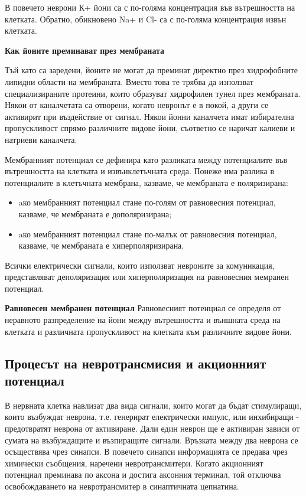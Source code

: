 \documentclass{article}
\numberwithin{equation}{section}
\begin{document}
В повечето неврони К+ йони са с по-голяма концентрация във вътрешността на клетката. Обратно, обикновено Na+ и Cl- са с по-голяма концентрация извън клетката.

\vspace{5mm}
\textbf{Как йоните преминават през мембраната}

Тъй като са заредени, йоните не могат да преминат директно през хидрофобните липидни области на мембраната. Вместо това те трябва да
използват специализираните протеини, които образуват хидрофилен тунел през мембраната. Някои от каналчетата са отворени, когато невронът е в
покой, а други се активирит при въздействие от сигнал. Някои йонни каналчета имат избирателна пропускливост спрямо различните видове
йони, съответно се наричат калиеви и натриеви каналчета.

\vspace{5mm} %

Мембранният потенциал се дефинира като разликата между потенциалите във вътрешността на клетката и извънклетъчната среда.
Понеже има разлика в потенциалите в клетъчната мембрана, казваме, че мембраната е поляризирана:
\begin{itemize}
  \item aко мембранният потенциал стане по-голям от равновесния потенциал, казваме, че мембраната е дополяризирана;
  \item aко мембранният потенциал стане по-малък от равновесния потенциал, казваме, че мембраната е хиперполяризирана.
\end{itemize}

Всички електрически сигнали, които използват невроните за комуникация, представляват деполяризация или хиперполяризация на равновесния мемранен потенциал.

\vspace{5mm} %
\textbf{Равновесен мембранен потенциал}
Равновесният потенциал се определя от неравното разпределение на йони между вътрешността и външната среда на клетката и различната пропускливост на клетката към различните видове йони.


\vspace{5mm} %
\subsection{Процесът на невротрансмисия и акционният потенциал}
В нервната клетка навлизат два вида сигнали, които могат да бъдат стимулиращи, които възбуждат неврона, т.е. генерират електрически импулс,
или инхибиращи - предотвратят неврона от активиране.  Дали един неврон ще е активиран зависи от сумата на възбуждащите и възпиращите
сигнали.  Връзката между два неврона се осъществява чрез синапси. В повечето синапси информацията се предава чрез химически съобщения,
наречени невротрансмитери. Когато акционният потенциал преминава по аксона и достига аксонния терминал, той отключва освобождаването на
невротрансмитер в синаптичната цепнатина.
\end{document}
